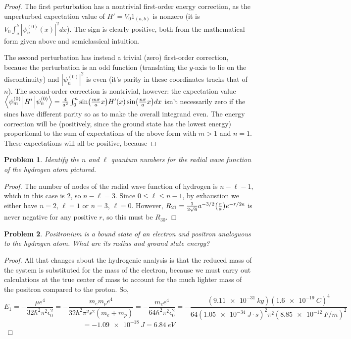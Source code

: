 \documentclass{article}
\newtheorem{plm}{Problem}
\begin{document}
\begin{proof}
  The first perturbation has a nontrivial first-order energy correction, as the unperturbed expectation value of $H' = V_{0}1_{(a, b)}$
  is nonzero (it is $V_{0}\int_{a}^{b}|\psi_{n}^{(0)}(x)|^{2}dx$).
  The sign is clearly positive, both from the mathematical form given above and semiclassical intuition.

  The second perturbation has instead a trivial (zero) first-order correction, because the perturbation is an odd function
  (translating the $y$-axis to lie on the discontinuity) and $|\psi_{n}^{(0)}|^{2}$ is even (it's parity in these coordinates tracks that of $n$).
  The second-order correction is nontrivial, however:
  the expectation value $\bra{\psi_{m}^{(0)}}H'\ket{\psi_{n}^{(0)}} = \frac{4}{a^{2}}\int_{0}^{a}\sin(\frac{m\pi}{a}x)H'(x)\sin(\frac{n\pi}{a}x)dx$
  isn't necessarily zero if the sines have different parity so as to make the overall integrand even.
  The energy correction will be (positively, since the ground state has the lowest energy)
  proportional to the sum of expectations of the above form with $m > 1$ and $n = 1$.
  These expectations will all be positive, because %
\end{proof}

\begin{plm}
  Identify the $n$ and $\ell$ quantum numbers for the radial wave function of the hydrogen atom pictured.
\end{plm}

\begin{proof}
  The number of nodes of the radial wave function of hydrogen is $n - \ell - 1$, which in this case is $2$, so $n - \ell = 3$.
  Since $0 \leq \ell \leq n - 1$, by exhaustion we either have $n = 2$, $\ell = 1$ or $n = 3$, $\ell = 0$.
  However, $R_{21} = \frac{1}{2\sqrt{6}}a^{-3/2}\qty(\frac{r}{a})e^{-r/2a}$ is never negative for any positive $r$, so this must be $R_{30}$.
\end{proof}

\begin{plm}
  Positronium is a bound state of an electron and positron analoguous to the hydrogen atom.
  What are its radius and ground state energy?
\end{plm}

\begin{proof}
  All that changes about the hydrogenic analysis is that the reduced mass of the system is substituted for the mass of the electron,
  because we must carry out calculations at the true center of mass to account for the much lighter mass of the positron compared to the proton.
  So,
  \[
    E_{1} = -\frac{\mu e^{4}}{32\hbar^{2}\pi^{2}\epsilon_{0}^{2}} = -\frac{m_{e}m_{p}e^{4}}{32\hbar^{2}\pi^{2}\epsilon^{2}(m_{e} + m_{p})}
    = -\frac{m_{e}e^{4}}{64\hbar^{2}\pi^{2}\epsilon_{0}^{2}}
    = -\frac{(\SI{9.11e-31}{kg})(\SI{1.6e-19}{C})^{4}}{64(\SI{1.05e-34}{J \cdot s})^{2}\pi^{2}(\SI{8.85e-12}{F / m})^{2}}
  \]
  \[
    = -\SI{1.09e-18}{J} = \SI{6.84}{eV}
  \]
\end{proof}
\end{document}
